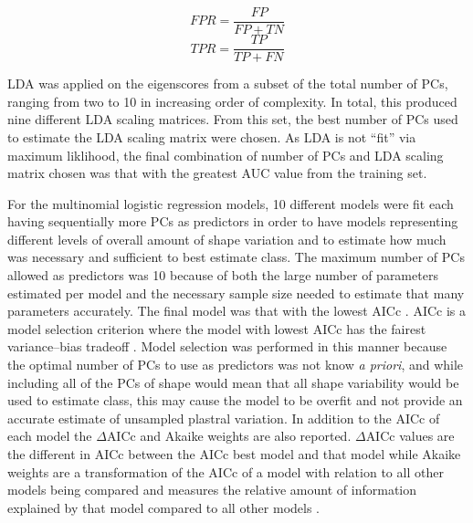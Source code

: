 \documentclass[12pt,letterpaper]{article}\usepackage{graphicx, color}
\begin{document}
\begin{equation}
  FPR = \frac{FP}{FP + TN}
  \label{eq:fpr}
\end{equation}
\begin{equation}
  TPR = \frac{TP}{TP + FN}
  \label{eq:tpr}
\end{equation}

LDA was applied on the eigenscores from a subset of the total number of PCs, ranging from two to 10 in increasing order of complexity. In total, this produced nine different LDA scaling matrices. From this set, the best number of PCs used to estimate the LDA scaling matrix were chosen. As LDA is not ``fit'' via maximum liklihood, the final combination of number of PCs and LDA scaling matrix chosen was that with the greatest AUC value from the training set.

For the multinomial logistic regression models, 10 different models were fit each having sequentially more PCs as predictors in order to have models representing different levels of overall amount of shape variation and to estimate how much was necessary and sufficient to best estimate class. The maximum number of PCs allowed as predictors was 10 because of both the large number of parameters estimated per model and the necessary sample size needed to estimate that many parameters accurately. The final model was that with the lowest AICc \citep{Akaike1974,Hurvich1989,Burnham2002a}. AICc is a model selection criterion where the model with lowest AICc has the fairest variance--bias tradeoff \citep{Burnham2002a}. Model selection was performed in this manner because the optimal number of PCs to use as predictors was not know \textit{a priori}, and while including all of the PCs of shape would mean that all shape variability would be used to estimate class, this may cause the model to be overfit and not provide an accurate estimate of unsampled plastral variation. In addition to the AICc of each model the \(\Delta\)AICc and Akaike weights are also reported. \(\Delta\)AICc values are the different in AICc between the AICc best model and that model while Akaike weights are a transformation of the AICc of a model with relation to all other models being compared and measures the relative amount of information explained by that model compared to all other models \citep{Burnham2002a}. 
\end{document}
